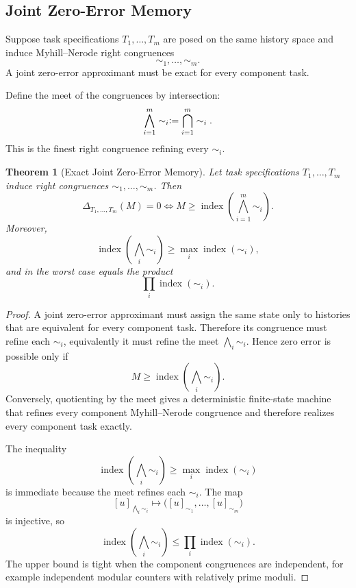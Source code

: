 \documentclass[12pt]{article}
\newtheorem{theorem}{Theorem}[section]
\theoremstyle{definition}
\newcommand{\eqdef}{\vcentcolon=}
\begin{document}
\subsection{Joint Zero-Error Memory}
\label{subsec:joint-zero-error}

Suppose task specifications $T_1,\dots,T_m$ are posed on the same history
space and induce Myhill--Nerode right congruences
\[
\sim_1,\dots,\sim_m.
\]
A joint zero-error approximant must be exact for every component task.

Define the meet of the congruences by intersection:
\[
\bigwedge_{i=1}^m \sim_i
\eqdef
\bigcap_{i=1}^m \sim_i.
\]
This is the finest right congruence refining every $\sim_i$.

\begin{theorem}[Exact Joint Zero-Error Memory]
\label{thm:joint}
Let task specifications $T_1,\dots,T_m$ induce right congruences
$\sim_1,\dots,\sim_m$.  Then
\[
\Delta_{T_1,\dots,T_m}(M)=0
\iff
M\ge
\operatorname{index}
\left(
\bigwedge_{i=1}^m\sim_i
\right).
\]
Moreover,
\[
\operatorname{index}
\left(
\bigwedge_i\sim_i
\right)
\ge
\max_i\operatorname{index}(\sim_i),
\]
and in the worst case equals the product
\[
\prod_i\operatorname{index}(\sim_i).
\]
\end{theorem}

\begin{proof}
A joint zero-error approximant must assign the same state only to histories
that are equivalent for every component task.  Therefore its congruence must
refine each $\sim_i$, equivalently it must refine the meet
$\bigwedge_i\sim_i$.  Hence zero error is possible only if
\[
M\ge
\operatorname{index}
\left(
\bigwedge_i\sim_i
\right).
\]
Conversely, quotienting by the meet gives a deterministic finite-state machine
that refines every component Myhill--Nerode congruence and therefore realizes every
component task exactly.

The inequality
\[
\operatorname{index}
\left(
\bigwedge_i\sim_i
\right)
\ge
\max_i\operatorname{index}(\sim_i)
\]
is immediate because the meet refines each $\sim_i$.  The map
\[
[u]_{\bigwedge_i\sim_i}
\mapsto
\bigl(
[u]_{\sim_1},\dots,[u]_{\sim_m}
\bigr)
\]
is injective, so
\[
\operatorname{index}
\left(
\bigwedge_i\sim_i
\right)
\le
\prod_i\operatorname{index}(\sim_i).
\]
The upper bound is tight when the component congruences are independent, for
example independent modular counters with relatively prime moduli.
\end{proof}
\end{document}
